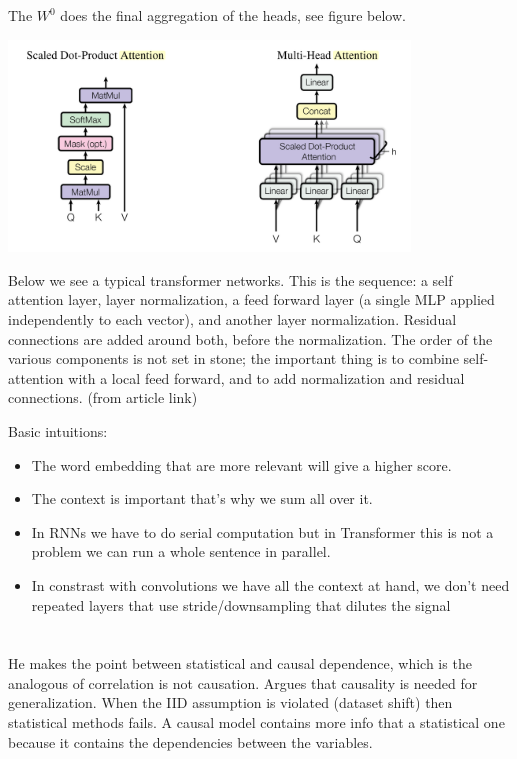 \documentclass{article}
\newcommand{\citeall}[1]{\citeauthor{#1}}
\newcommand{\uls}{\begin{itemize}}
\newcommand{\ule}{\end{itemize}}
\newcommand{\li}{\item}
\begin{document}
 The $W^0$ does the final aggregation of the heads, see figure below.

\includegraphics[width=0.8\textwidth]{images/attention.png}

Below we see a typical transformer networks. This is the sequence: a self attention layer, layer normalization, a feed forward layer (a single MLP applied independently to each vector), and another layer normalization. Residual connections are added around both, before the normalization. The order of the various components is not set in stone; the important thing is to combine self-attention with a local feed forward, and to add normalization and residual connections. (from article link)



Basic intuitions:

\uls
\li The word embedding that are more relevant will give a higher score.
\li The context is important that's why we sum all over it.
\li In RNNs we have to do serial computation but in Transformer this is not a problem we can run a whole sentence in parallel.
\li In constrast with convolutions we have all the context at hand, we don't need repeated layers that use stride/downsampling that dilutes the signal
\ule

\section{\citeall{Scholkopf2019CausalityLearning}}

He makes the point between statistical and causal dependence, which is the analogous of correlation is not causation. Argues that causality is needed for generalization. When the IID assumption is violated (dataset shift) then statistical methods fails. A causal model contains more info that a statistical one because it contains the dependencies between the variables. 
\end{document}
